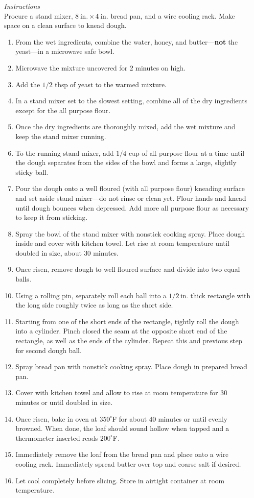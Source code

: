 \documentclass{article}
\newcommand{\instructions}[1][\Large\emph{Instructions}]{%
    \emph{#1}\\}
\newcommand{\temp}[1]{%
    $#1^\circ$F}
\begin{document}
\instructions
Procure a stand mixer, $8~\mathrm{in.}\times4~\mathrm{in.}$ bread pan, and a wire cooling rack. Make space on a clean surface to knead dough.
\begin{enumerate}
    \item From the wet ingredients, combine the water, honey, and butter---\textbf{not} the yeast---in a microwave safe bowl.
    \item Microwave the mixture uncovered for $2$ minutes on high.\footnotemark[5]
    \item Add the $1/2$ tbsp of yeast to the warmed mixture.
    \item In a stand mixer set to the slowest setting, combine all of the dry ingredients except for the all purpose flour.
    \item Once the dry ingredients are thoroughly mixed, add the wet mixture and keep the stand mixer running.
    \item To the running stand mixer, add $1/4$ cup of all purpose flour at a time until the dough separates from the sides of the bowl and forms a large, slightly sticky ball.
    \item Pour the dough onto a well floured (with all purpose flour) kneading surface and set aside stand mixer---do not rinse or clean yet. Flour hands and knead until dough bounces when depressed. Add more all purpose flour as necessary to keep it from sticking.
    \item Spray the bowl of the stand mixer with nonstick cooking spray. Place dough inside and cover with kitchen towel. Let rise at room temperature until doubled in size, about $30$ minutes.
    \item Once risen, remove dough to well floured surface and divide into two equal balls.
    \item Using a rolling pin, separately roll each ball into a $1/2~\mathrm{in.}$ thick rectangle with the long side roughly twice as long as the short side.
    \item Starting from one of the short ends of the rectangle, tightly roll the dough into a cylinder. Pinch closed the seam at the opposite short end of the rectangle, as well as the ends of the cylinder. Repeat this and previous step for second dough ball.\footnotemark[6]
    \item Spray bread pan with nonstick cooking spray. Place dough in prepared bread pan.
    \item Cover with kitchen towel and allow to rise at room temperature for $30$ minutes or until doubled in size.
    \item Once risen, bake in oven at \temp{350} for about $40$ minutes or until evenly browned. When done, the loaf should sound hollow when tapped and a thermometer inserted reads \temp{200}.
    \item Immediately remove the loaf from the bread pan and place onto a wire cooling rack. Immediately spread butter over top and coarse salt if desired.
    \item Let cool completely before slicing. Store in airtight container at room temperature.
\end{enumerate}
\end{document}
